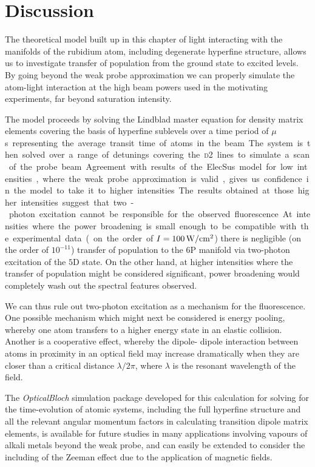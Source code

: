 \section{Discussion}
  \label{sec:twophoton_discussion}

  The theoretical model built up in this chapter of light interacting with the
  manifolds of the rubidium atom, including degenerate hyperfine structure,
  allows us to investigate transfer of population from the ground state to
  excited levels. By going beyond the weak probe approximation we can properly
  simulate the atom-light interaction at the high beam powers used in the
  motivating experiments, far beyond saturation intensity.

  The model proceeds by solving the Lindblad master equation for density matrix
  elements covering the basis of hyperfine sublevels over a time period of
  \unit[2]{$\mu $s} representing the average transit time of atoms in the beam.
  The system is then solved over a range of detunings covering the \textsc{d2}
  lines to simulate a scan of the probe beam.

  Agreement with results of the ElecSus model for low intensities, where the
  weak probe approximation is valid, gives us confidence in the model to take it
  to higher intensities. The results obtained at those higher intensities
  suggest that two-photon excitation cannot be responsible for the observed
  fluorescence. At intensities where the power broadening is small enough to be
  compatible with the experimental data (on the order of $I =
  \unit[100]{W/cm^2}$) there is negligible (on the order of $10^{-11}$) transfer
  of population to the $6$P manifold via two-photon excitation of the $5$D state. On
  the other hand, at higher intensities where the transfer of population might
  be considered significant, power broadening would completely wash out the
  spectral features observed. 

  We can thus rule out two-photon excitation as a mechanism for the
  fluorescence. One possible mechanism which might next be considered is energy
  pooling, whereby one atom transfers to a higher energy state in an elastic
  collision\cite{Namiotka1997,Bearman1978}. Another is a cooperative
  effect\cite{Bettles2016,Bettles2015}, whereby the dipole- dipole interaction
  between atoms in proximity in an optical field may increase dramatically when
  they are closer than a critical distance $\lambda/2\pi$, where $\lambda$ is
  the resonant wavelength of the field.

  The \textit{OpticalBloch} simulation package developed for this calculation
  for solving for the time-evolution of atomic systems, including the full
  hyperfine structure and all the relevant angular momentum factors in
  calculating transition dipole matrix elements, is available for future studies
  in many applications involving vapours of alkali metals beyond the weak probe,
  and can easily be extended to consider the including of the Zeeman effect due
  to the application of magnetic fields.
